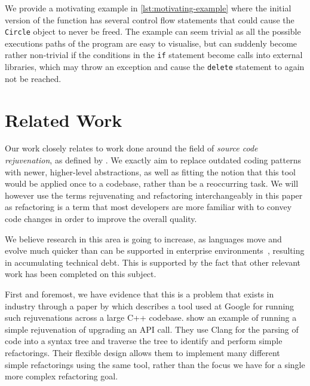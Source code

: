 \documentclass{mpaper}
\begin{document}
    We provide a motivating example in \autoref{lst:motivating-example} where the initial version of the function has several control flow statements that could cause the \texttt{Circle} object to never be freed.
    The example can seem trivial as all the possible executions paths of the program are easy to visualise, but can suddenly become rather non-trivial if the conditions in the \texttt{if} statement become calls into external libraries, which may throw an exception and cause the \texttt{delete} statement to again not be reached.

    


    \section{Related Work}\label{sec:related-work}
    
    Our work closely relates to work done around the field of \emph{source code rejuvenation}, as defined by \citet{Pirkelbauer2010}. 
    We exactly aim to replace outdated coding patterns with newer, higher-level abstractions, as well as fitting the notion that this tool would be applied once to a codebase, rather than be a reoccurring task.
    We will however use the terms rejuvenating and refactoring interchangeably in this paper as refactoring is a term that most developers are more familiar with to convey code changes in order to improve the overall quality. 
    
    We believe research in this area is going to increase, as languages move and evolve much quicker than can be supported in enterprise environments~\cite{Overbey2009, Favre2005}, resulting in accumulating technical debt. 
    This is supported by the fact that other relevant work has been completed on this subject.
    
    First and foremost, we have evidence that this is a problem that exists in industry through a paper by \citet{Wright2013} which describes a tool used at Google for running such rejuvenations across a large C++ codebase. 
    \citet{Wright2013} show an example of running a simple rejuvenation of upgrading an API call.
    They use Clang for the parsing of code into a syntax tree and traverse the tree to identify and perform simple refactorings.
    Their flexible design allows them to implement many different simple refactorings using the same tool, rather than the focus we have for a single more complex refactoring goal.
\end{document}
